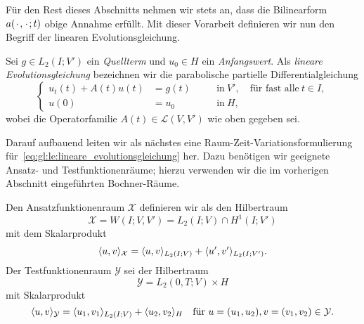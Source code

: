 Für den Rest dieses Abschnitts nehmen wir stets an, dass die Bilinearform $a({\mkern2mu\cdot\mkern2mu}, {\mkern2mu\cdot\mkern2mu}; t)$ obige Annahme erfüllt.
Mit dieser Vorarbeit definieren wir nun den Begriff der linearen Evolutionsgleichung.

\begin{Definition}
\label{def:gl:le:lineare_evolutionsgleichung}
    Sei $g \in L_{2}(I; V')$ ein \emph{Quellterm} und $u_{0} \in H$ ein \emph{Anfangswert}.
    Als \emph{lineare Evolutionsgleichung} bezeichnen wir die parabolische partielle Differentialgleichung
    \begin{equation}
        \label{eq:gl:le:lineare_evolutionsgleichung}
        \left\{
        \begin{aligned}
            u_{t}(t) + A(t) u(t) &= g(t)     \quad&&\text{in}~V', \quad \text{für fast alle}~t \in I, \\
            u(0) &= u_{0}                    \quad&&\text{in}~H,
        \end{aligned}
        \right.
    \end{equation}
    wobei die  Operatorfamilie $A(t) \in \mathcal L(V, V')$ wie oben gegeben sei.
\end{Definition}

Darauf aufbauend leiten wir als nächstes eine Raum-Zeit-Variationsformulierung für~\cref{eq:gl:le:lineare_evolutionsgleichung} her.
Dazu benötigen wir geeignete Ansatz- und Testfunktionenräume; hierzu verwenden wir die im vorherigen Abschnitt eingeführten Bochner-Räume.

\begin{Definition}
\label{def:gl:le:ansatz_und_testraum}
    Den Ansatzfunktionenraum $\mathcal X$ definieren wir als den Hilbertraum
    \begin{equation}
        \label{eq:gl:le:ansatzraum_X}
        \mathcal X = W(I; V, V') = L_{2}(I; V) \cap H^{1}(I; V')
    \end{equation}
    mit dem Skalarprodukt
    \begin{equation}
        \langle u,v\rangle_{\mathcal X} = \langle u,v\rangle_{L_{2}(I; V)} + \langle u',v'\rangle_{L_{2}(I; V')}.
    \end{equation}
    Der Testfunktionenraum $\mathcal Y$ sei der Hilbertraum
    \begin{equation}
    \label{eq:gl:le:testraum_Y}
        \mathcal Y = L_{2}(0, T; V) \times H
    \end{equation}
    mit Skalarprodukt
    \begin{equation}
        \label{eq:gl:le:testraum_Y_norm}
        \langle u,v\rangle_{\mathcal Y} = \langle u_{1},v_{1}\rangle_{L_{2}(I; V)} + \langle u_{2},v_{2}\rangle_{H} \quad \text{für } u = (u_{1}, u_{2}), v = (v_{1}, v_{2}) \in \mathcal Y.
    \end{equation}
\end{Definition}

